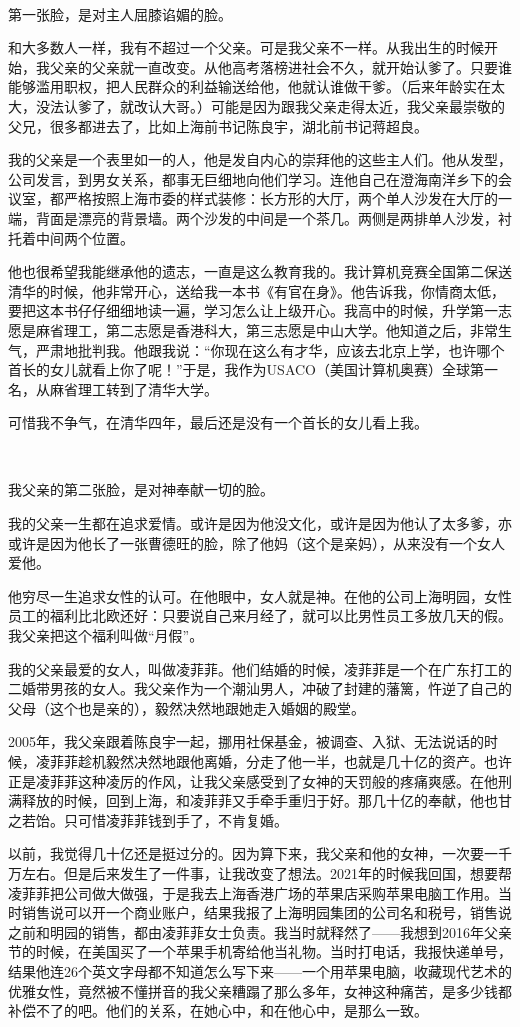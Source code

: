 \ 

第一张脸，是对主人屈膝谄媚的脸。

和大多数人一样，我有不超过一个父亲。可是我父亲不一样。从我出生的时候开始，我父亲的父亲就一直改变。从他高考落榜进社会不久，就开始认爹了。只要谁能够滥用职权，把人民群众的利益输送给他，他就认谁做干爹。（后来年龄实在太大，没法认爹了，就改认大哥。）可能是因为跟我父亲走得太近，我父亲最崇敬的父兄，很多都进去了，比如上海前书记陈良宇，湖北前书记蒋超良。

我的父亲是一个表里如一的人，他是发自内心的崇拜他的这些主人们。他从发型，公司发言，到男女关系，都事无巨细地向他们学习。连他自己在澄海南洋乡下的会议室，都严格按照上海市委的样式装修：长方形的大厅，两个单人沙发在大厅的一端，背面是漂亮的背景墙。两个沙发的中间是一个茶几。两侧是两排单人沙发，衬托着中间两个位置。

他也很希望我能继承他的遗志，一直是这么教育我的。我计算机竞赛全国第二保送清华的时候，他非常开心，送给我一本书《有官在身》。他告诉我，你情商太低，要把这本书仔仔细细地读一遍，学习怎么让上级开心。我高中的时候，升学第一志愿是麻省理工，第二志愿是香港科大，第三志愿是中山大学。他知道之后，非常生气，严肃地批判我。他跟我说：``你现在这么有才华，应该去北京上学，也许哪个首长的女儿就看上你了呢！''于是，我作为USACO（美国计算机奥赛）全球第一名，从麻省理工转到了清华大学。

可惜我不争气，在清华四年，最后还是没有一个首长的女儿看上我。

\  

我父亲的第二张脸，是对神奉献一切的脸。

我的父亲一生都在追求爱情。或许是因为他没文化，或许是因为他认了太多爹，亦或许是因为他长了一张曹德旺的脸，除了他妈（这个是亲妈），从来没有一个女人爱他。

他穷尽一生追求女性的认可。在他眼中，女人就是神。在他的公司上海明园，女性员工的福利比北欧还好：只要说自己来月经了，就可以比男性员工多放几天的假。我父亲把这个福利叫做``月假''。

我的父亲最爱的女人，叫做凌菲菲。他们结婚的时候，凌菲菲是一个在广东打工的二婚带男孩的女人。我父亲作为一个潮汕男人，冲破了封建的藩篱，忤逆了自己的父母（这个也是亲的），毅然决然地跟她走入婚姻的殿堂。

2005年，我父亲跟着陈良宇一起，挪用社保基金，被调查、入狱、无法说话的时候，凌菲菲趁机毅然决然地跟他离婚，分走了他一半，也就是几十亿的资产。也许正是凌菲菲这种凌厉的作风，让我父亲感受到了女神的天罚般的疼痛爽感。在他刑满释放的时候，回到上海，和凌菲菲又手牵手重归于好。那几十亿的奉献，他也甘之若饴。只可惜凌菲菲钱到手了，不肯复婚。

以前，我觉得几十亿还是挺过分的。因为算下来，我父亲和他的女神，一次要一千万左右。但是后来发生了一件事，让我改变了想法。2021年的时候我回国，想要帮凌菲菲把公司做大做强，于是我去上海香港广场的苹果店采购苹果电脑工作用。当时销售说可以开一个商业账户，结果我报了上海明园集团的公司名和税号，销售说之前和明园的销售，都由凌菲菲女士负责。我当时就释然了——我想到2016年父亲节的时候，在美国买了一个苹果手机寄给他当礼物。当时打电话，我报快递单号，结果他连26个英文字母都不知道怎么写下来——一个用苹果电脑，收藏现代艺术的优雅女性，竟然被不懂拼音的我父亲糟蹋了那么多年，女神这种痛苦，是多少钱都补偿不了的吧。他们的关系，在她心中，和在他心中，是那么一致。

